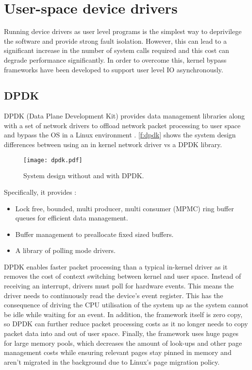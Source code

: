 \section{User-space device drivers}\label{s:userspace_dd}
Running device drivers as user level programs is the simplest way to deprivilege the software and provide
strong fault isolation. However, this can lead to a significant increase in the number of system calls
required and this cost can degrade performance significantly. In order to overcome this, kernel bypass
frameworks have been developed to support user level IO asynchronously.

\subsection{DPDK}\label{dpdk}
DPDK (Data Plane Development Kit) provides data management libraries along with a set of network drivers to offload
network packet processing to user space and bypass the OS in a Linux environment \cite{DPDK:wp_20}. \autoref{f:dpdk}
shows the system design differences between using an in kernel network driver vs a DPDK library.

\begin{figure}[h]
  \centering
  \texttt{[image: dpdk.pdf]}
  \caption{System design without and with DPDK.}
  \label{f:dpdk}
\end{figure}

Specifically, it provides \cite{DPDK:wp_20}:
\begin{itemize}
	\item Lock free, bounded, multi producer, multi consumer (MPMC) ring buffer queues for efficient data management.
	\item Buffer management to preallocate fixed sized buffers.
	\item A library of polling mode drivers.
\end{itemize}

DPDK enables faster packet processing than a typical in-kernel driver as it removes the cost of context switching
between kernel and user space. Instead of receiving an interrupt, drivers must poll for hardware events. 
This means the driver needs to continuously read the device's event register. This has the consequence of driving
the CPU utilisation of the system up as the system cannot be idle while waiting for an event. 
In addition, the framework itself is zero copy, so DPDK can further reduce packet processing costs as it no longer needs to copy 
packet data into and out of user space. Finally, the framework uses huge pages for large memory pools, 
which decreases the amount of look-ups and other page management costs while ensuring relevant pages stay pinned in memory and
aren't migrated in the background due to Linux's page migration policy.

